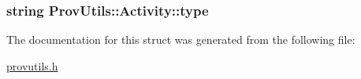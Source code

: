 \hypertarget{struct_prov_utils_1_1_activity_a210efd6ae1c8bf6ef64265374d745b93}{
\subsubsection[{type}]{\setlength{\rightskip}{0pt plus 5cm}string Prov\-Utils\-::\-Activity\-::type}}\label{struct_prov_utils_1_1_activity_a210efd6ae1c8bf6ef64265374d745b93}


The documentation for this struct was generated from the following file\-:\begin{DoxyCompactItemize}
\item 
\hyperlink{provutils_8h}{provutils.\-h}\end{DoxyCompactItemize}
